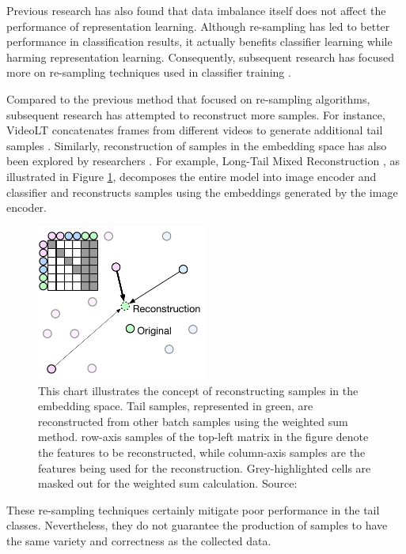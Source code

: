 Previous research has also found that data imbalance itself does not affect the performance of representation learning. Although re-sampling has led to better performance in classification results, it actually benefits classifier learning while harming representation learning. Consequently, subsequent research has focused more on re-sampling techniques used in classifier training \parencite{zhou2020bbn, kang2019decoupling}.

Compared to the previous method that focused on re-sampling algorithms, subsequent research has attempted to reconstruct more samples. For instance, VideoLT concatenates frames from different videos to generate additional tail samples \parencite{zhang2021videolt}. Similarly, reconstruction of samples in the embedding space has also been explored by researchers \parencite{liu2022long, perrett2023use}. For example, Long-Tail Mixed Reconstruction \parencite{perrett2023use}, as illustrated in Figure \ref{fig:augembedding}, decomposes the entire model into image encoder and classifier and reconstructs samples using the embeddings generated by the image encoder.

\begin{figure}[ht]
    \centering
    \includegraphics[width=0.5\textwidth]{assets/charts_rw/AugEmbedding}
    \caption[Illustration of Reconstruction of Samples in the Embedding Space]{This chart illustrates the concept of reconstructing samples in the embedding space. Tail samples, represented in green, are reconstructed from other batch samples using the weighted sum method. row-axis samples of the top-left matrix in the figure denote the features to be reconstructed, while column-axis samples are the features being used for the reconstruction. Grey-highlighted cells are masked out for the weighted sum calculation. Source: \parencite{perrett2023use}}
    \label{fig:augembedding}
\end{figure}

These re-sampling techniques certainly mitigate poor performance in the tail classes. Nevertheless, they do not guarantee the production of samples to have the same variety and correctness as the collected data.

